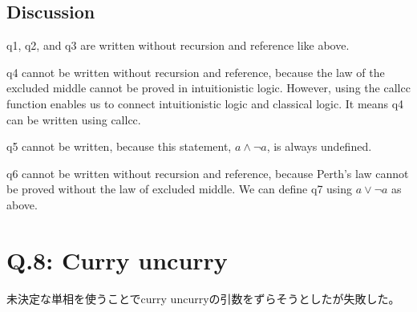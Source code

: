 \documentclass[uplatex,12pt]{jsarticle}
\begin{document}
\subsection{Discussion}
q1, q2, and q3 are written without recursion and reference like above.

q4 cannot be written without recursion and reference, because the law of the excluded middle cannot be proved in intuitionistic logic. However, using the callcc function enables us to connect intuitionistic logic and classical logic. It means q4 can be written using callcc.

q5 cannot be written, because this statement, $a \land \lnot a$, is always undefined.

q6 cannot be written without recursion and reference, because Perth's law cannot be proved without the law of excluded middle. We can define q7 using $a \lor \lnot a$ as above.

\section{Q.8: Curry uncurry}

未決定な単相を使うことでcurry uncurryの引数をずらそうとしたが失敗した。
\end{document}
